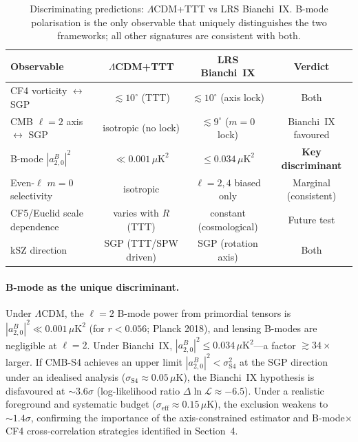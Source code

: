 \documentclass[12pt]{article}
\begin{document}
\begin{table}[h]
\centering
\caption{Discriminating predictions: $\Lambda$CDM+TTT vs LRS Bianchi~IX.
B-mode polarisation is the only observable that uniquely distinguishes the two
frameworks; all other signatures are consistent with both.}
\label{tab:discriminate}
\begin{tabular}{lccc}
\toprule
Observable & $\Lambda$CDM+TTT & LRS Bianchi~IX & Verdict \\
\midrule
CF4 vorticity $\leftrightarrow$ SGP
  & $\lesssim10^\circ$ (TTT)
  & $\lesssim10^\circ$ (axis lock)
  & Both \\
CMB $\ell=2$ axis $\leftrightarrow$ SGP
  & isotropic (no lock)
  & $\lesssim9^\circ$ ($m=0$ lock)
  & Bianchi~IX favoured \\
B-mode $|a^B_{2,0}|^2$
  & $\ll0.001\,\mu\mathrm{K}^2$
  & $\leq0.034\,\mu\mathrm{K}^2$
  & \textbf{Key discriminant} \\
Even-$\ell$ $m=0$ selectivity
  & isotropic
  & $\ell=2,4$ biased only
  & Marginal (consistent) \\
CF5/Euclid scale dependence
  & varies with $R$ (TTT)
  & constant (cosmological)
  & Future test \\
kSZ direction
  & SGP (TTT/SPW driven)
  & SGP (rotation axis)
  & Both \\
\bottomrule
\end{tabular}
\end{table}

\paragraph{B-mode as the unique discriminant.}
Under $\Lambda$CDM, the $\ell=2$ B-mode power from primordial tensors is
$|a^B_{2,0}|^2 \ll 0.001\,\mu\mathrm{K}^2$ (for $r<0.056$; Planck 2018),
and lensing B-modes are negligible at $\ell=2$.
Under Bianchi~IX, $|a^B_{2,0}|^2\leq0.034\,\mu\mathrm{K}^2$---a factor
$\gtrsim34\times$ larger.
If CMB-S4 achieves an upper limit $|a^B_{2,0}|^2 < \sigma^2_\mathrm{S4}$ at the
SGP direction under an idealised analysis ($\sigma_\mathrm{S4}\approx0.05\,\mu$K),
the Bianchi~IX hypothesis is disfavoured at $\sim3.6\sigma$
(log-likelihood ratio $\Delta\ln\mathcal{L} \approx -6.5$).
Under a realistic foreground and systematic budget
($\sigma_\mathrm{eff}\approx0.15\,\mu$K), the exclusion weakens to $\sim1.4\sigma$,
confirming the importance of the axis-constrained estimator and B-mode$\times$CF4
cross-correlation strategies identified in Section~4.
\end{document}
